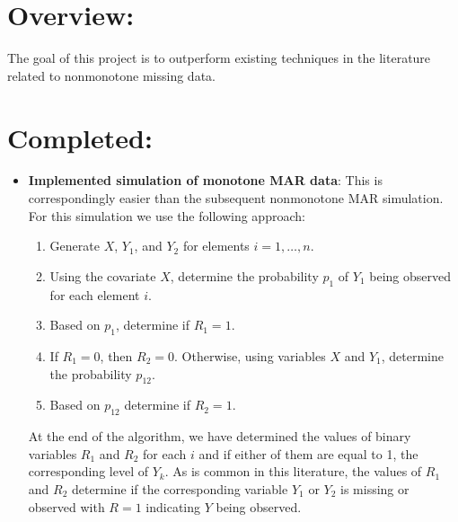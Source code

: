 \documentclass[12pt]{article}
\begin{document}

\section*{Overview:}

The goal of this project is to outperform existing techniques in the literature
related to nonmonotone missing data.

\section*{Completed:}

\begin{itemize}
  \item \textbf{Implemented simulation of monotone MAR data}: This is 
  correspondingly easier
  than the subsequent nonmonotone MAR simulation. For this simulation we use the 
  following approach:
  \begin{enumerate}
      \item Generate $X$, $Y_1$, and $Y_2$ for elements $i = 1, \dots, n$.
      \item Using the covariate $X$, determine the probability $p_1$ of $Y_1$
      being observed for each element $i$.
      \item Based on $p_1$, determine if $R_1 = 1$.
      \item If $R_1 = 0$, then $R_2 = 0$. Otherwise, using variables $X$ and
        $Y_1$, determine the probability $p_{12}$.
      \item Based on $p_{12}$ determine if $R_2 = 1$.
  \end{enumerate}
  At the end of the algorithm, we have determined the values of binary variables
    $R_1$ and $R_2$ for each $i$ and if either of them are equal to 1, the
    corresponding level of $Y_{k}$. As is common in this literature, the values
    of $R_1$ and $R_2$ determine if the corresponding variable $Y_1$ or $Y_2$ is
    missing or observed with $R = 1$ indicating $Y$ being observed.
  

\end{itemize}
\end{document}
